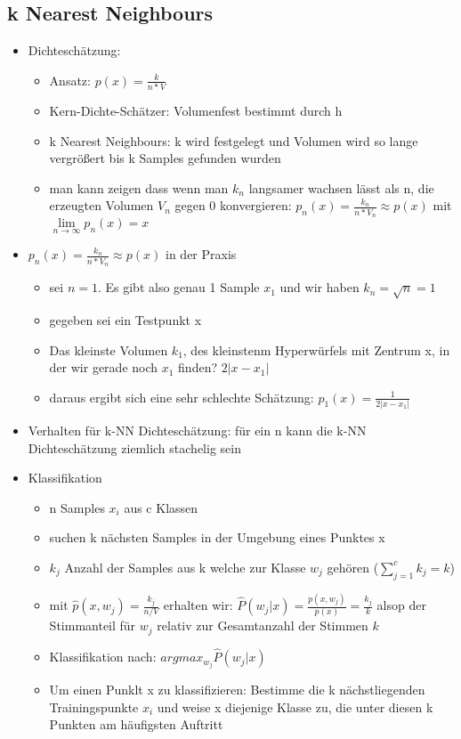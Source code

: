 \documentclass{article} %
\begin{document}
	\subsection{k Nearest Neighbours}
	\begin{itemize}
		\item Dichteschätzung:
		\begin{itemize}
			\item Ansatz: $p(x) = \frac{k}{n*V}$
			\item Kern-Dichte-Schätzer: Volumenfest bestimmt durch h
			\item k Nearest Neighbours: k wird festgelegt und Volumen wird so lange vergrößert bis k Samples gefunden wurden
			\item man kann zeigen dass wenn man $k_n$ langsamer wachsen lässt als n, die erzeugten Volumen $V_n$ gegen 0 konvergieren: $p_n(x) = \frac{k_n}{n*V_n} \approx p(x)$ mit $\lim\limits_{n\rightarrow \infty} p_n(x) = x$
		\end{itemize}
		\item $p_n(x) = \frac{k_n}{n*V_n} \approx p(x)$ in der Praxis 
		\begin{itemize}
			\item sei $n = 1$. Es gibt also genau 1 Sample $x_1$ und wir haben $k_n = \sqrt{n} = 1$
			\item gegeben sei ein Testpunkt x
			\item Das kleinste Volumen $k_1$, des kleinstenm Hyperwürfels mit Zentrum x, in der wir gerade noch $x_1$ finden? $2|x-x_1|$
			\item daraus ergibt sich eine sehr schlechte Schätzung: $p_1(x) = \frac{1}{2|x-x_1|}$
		\end{itemize}
		\item Verhalten für k-NN Dichteschätzung: für ein n kann die k-NN Dichteschätzung ziemlich stachelig sein
		\item Klassifikation
		\begin{itemize}
			\item n Samples $x_i$ aus c Klassen
			\item suchen k nächsten Samples in der Umgebung eines Punktes x
			\item $k_j$ Anzahl der Samples aus k welche zur Klasse $w_j$ gehören ($\sum_{j=1}^{c}k_j = k$)
			\item mit $\hat{p}(x,w_j) = \frac{k_j}{n/V}$ erhalten wir: $\hat{P}(w_j|x) = \frac{p(x,w_j)}{p(x)} = \frac{k_j}{k}$ alsop der Stimmanteil für $w_j$ relativ zur Gesamtanzahl der Stimmen $k$
			\item Klassifikation nach: $argmax_{w_j}\hat{P}(w_j|x)$
			\item Um einen Punklt x zu klassifizieren: Bestimme die k nächstliegenden Trainingspunkte $x_i$ und weise x diejenige Klasse zu, die unter diesen k Punkten am häufigsten Auftritt
		\end{itemize}
	\end{itemize}
\end{document}
